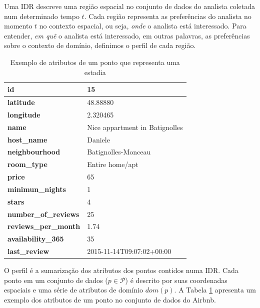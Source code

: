 Uma IDR descreve uma região espacial no conjunto de dados do analista coletada num determinado tempo $t$. Cada região representa as preferências do analista no momento $t$ no contexto espacial, ou seja, {\em onde} o analista está interessado. Para entender, {\em em quê} o analista está interessado, em outras palavras, as preferências sobre o contexto de domínio, definimos o perfil de cada região.

\begin{table}[]
	\centering
	\begin{tabular}{|l|l|}
		\hline
		\textbf{id}                  & 15                             \\ \hline
		\textbf{latitude}            & 48.88880                       \\ \hline
		\textbf{longitude}           & 2.320465                       \\ \hline
		\textbf{name}                & Nice appartment in Batignolles \\ \hline
		\textbf{host\_name}          & Daniele                        \\ \hline
		\textbf{neighbourhood}       & Batignolles-Monceau            \\ \hline
		\textbf{room\_type}          & Entire home/apt                \\ \hline
		\textbf{price}               & 65                             \\ \hline
		\textbf{minimun\_nights}     & 1                              \\ \hline
		\textbf{stars}               & 4                              \\ \hline
		\textbf{number\_of\_reviews} & 25                             \\ \hline
		\textbf{reviews\_per\_month} & 1.74                           \\ \hline
		\textbf{availability\_365}   & 35                             \\ \hline
		\textbf{last\_review}        & 2015-11-14T09:07:02+00:00      \\ \hline
	\end{tabular}
	\caption{Exemplo de atributos de um ponto que representa uma estadia}
	\label{table:atributos}
\end{table}

O perfil é a sumarização dos atributos dos pontos contidos numa IDR. Cada ponto em um conjunto de dados ($p \in \mathcal{P}$) é descrito por suas coordenadas espaciais e uma série de atributos de domínio $dom(p)$. A Tabela \ref{table:atributos} apresenta um exemplo dos atributos de um ponto no conjunto de dados do Airbnb.

